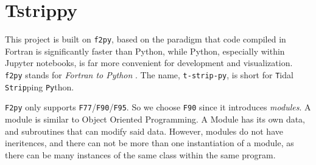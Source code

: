\documentclass{article}
\begin{document}
\section{Tstrippy}
    This project is built on \texttt{f2py}, based on the paradigm that code compiled in Fortran is significantly faster than Python, while Python, especially within Jupyter notebooks, is far more convenient for development and visualization. \texttt{f2py} stands for \textit{Fortran to Python} \citep{peterson2009f2py}. The name, \texttt{t-strip-py}, is short for \texttt{T}idal \texttt{Strip}ping \texttt{Py}thon. 

    \texttt{F2py} only supports \texttt{F77}/\texttt{F90}/\texttt{F95}. So we choose \texttt{F90} since it introduces \textit{modules}. A module is similar to Object Oriented Programming. A Module has its own data, and subroutines that can modify said data. However, modules do not have ineritences, and there can not be more than one instantiation of a module, as there can be many instances of the same class within the same program. 
\end{document}

